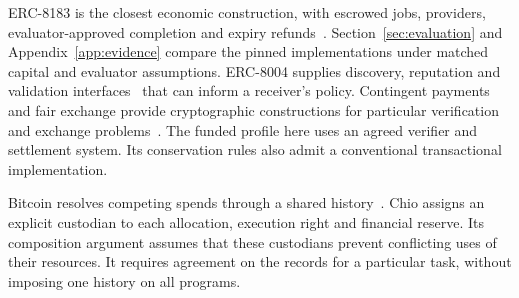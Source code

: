 ERC-8183 is the closest economic construction, with escrowed jobs, providers,
evaluator-approved completion and expiry refunds~\cite{erc8183}.
Section~\ref{sec:evaluation} and Appendix~\ref{app:evidence} compare the pinned
implementations under matched capital and evaluator assumptions.
ERC-8004 supplies discovery, reputation and validation interfaces~\cite{erc8004}
that can inform a receiver's policy. Contingent payments and fair exchange
provide cryptographic constructions for particular verification and exchange
problems~\cite{zkcsp,fairswap}. The funded profile here uses an agreed verifier
and settlement system. Its conservation rules also admit a conventional
transactional implementation.

Bitcoin resolves competing spends through a shared history~\cite{bitcoin}.
Chio assigns an explicit custodian to each allocation, execution right and
financial reserve. Its composition argument assumes that these custodians
prevent conflicting uses of their resources. It requires agreement on the
records for a particular task, without imposing one history on all programs.
